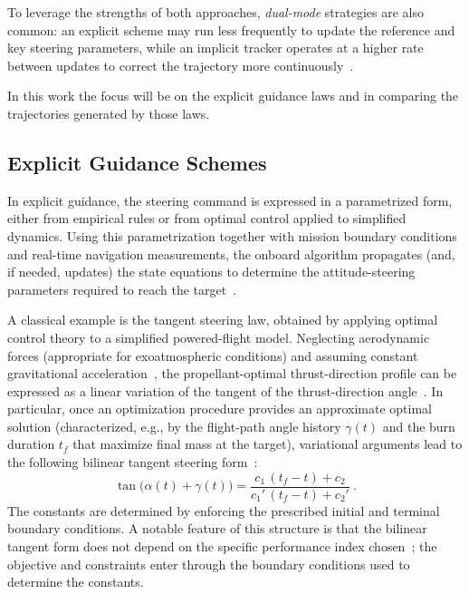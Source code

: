 To leverage the strengths of both approaches, \emph{dual-mode} strategies are also common: an explicit scheme may run less frequently to update the reference and key steering parameters, while an implicit tracker operates at a higher rate between updates to correct the trajectory more continuously~\cite{suresh2015integrated}.

In this work the focus will be on the explicit guidance laws and in comparing the trajectories generated by those laws.


\subsection{Explicit Guidance Schemes}

In explicit guidance, the steering command is expressed in a parametrized form,
either from empirical rules or from optimal control applied to simplified dynamics. Using
this parametrization together with mission boundary conditions and real-time navigation
measurements, the onboard algorithm propagates (and, if needed, updates) the state
equations to determine the attitude-steering parameters required to reach the target~\cite{teofilatto2025trajectories}.

A classical example is the tangent steering law, obtained by applying optimal control
theory to a simplified powered-flight model. Neglecting aerodynamic forces (appropriate
for exoatmospheric conditions) and assuming constant gravitational acceleration~\cite{Edberg}, the
propellant-optimal thrust-direction profile can be expressed as a linear variation of the
tangent of the thrust-direction angle~\cite{Edberg}.
In particular, once an optimization procedure provides an approximate optimal solution
(characterized, e.g., by the flight-path angle history $\gamma(t)$ and the burn duration $t_f$
that maximize final mass at the target), variational arguments lead to the following
bilinear tangent steering form~\cite{Ulrich}:
\begin{equation}
\tan\!\big(\alpha(t)+\gamma(t)\big)
=
\frac{c_1\,(t_f-t)+c_2}{c_1'\,(t_f-t)+c_2'} \ .
\end{equation}
The constants are determined by enforcing the prescribed initial and terminal boundary
conditions. A notable feature of this structure is that the bilinear tangent form does not
depend on the specific performance index chosen~\cite{Ulrich}; the objective and constraints enter
through the boundary conditions used to determine the constants.

